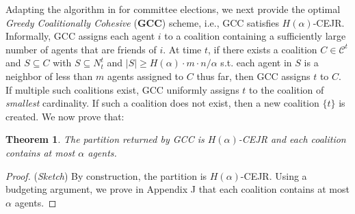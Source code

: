 \documentclass[letterpaper]{article} %
\newtheorem{theorem}{Theorem}
\begin{document}
Adapting the algorithm in \cite[Section 5.2]{do2022online} for committee elections, we next provide the optimal \textit{Greedy Coalitionally Cohesive} (\textbf{GCC}) scheme, i.e., GCC satisfies $H(\alpha)$-CEJR. Informally, GCC assigns each agent $i$ to a coalition containing a sufficiently large number of agents that are friends of $i$. At time $t$, if there exists a coalition $C \in \mathcal{C}^t$ and $S \subseteq C$ with $S \subseteq N_t^t$ and $|S| \geq H(\alpha) \cdot m \cdot n/\alpha$ s.t. each agent in $S$ is a neighbor of less than $m$ agents assigned to $C$ thus far, then GCC assigns $t$ to $C$. If multiple such coalitions exist, GCC uniformly assigns $t$ to the coalition of \textit{smallest} cardinality. If such a coalition does not exist, then a new coalition $\{t\}$ is created. We now prove that: %
\begin{theorem}
    \label{thm:gcc}
    The partition returned by GCC is $H(\alpha)$-CEJR and each coalition contains at most $\alpha$ agents.
\end{theorem}
\begin{proof}
    (\textit{Sketch})
    By construction, the partition is $H(\alpha)$-CEJR. Using a budgeting argument, we prove in Appendix J that each coalition contains at most $\alpha$ agents. %
\end{proof}
\end{document}
